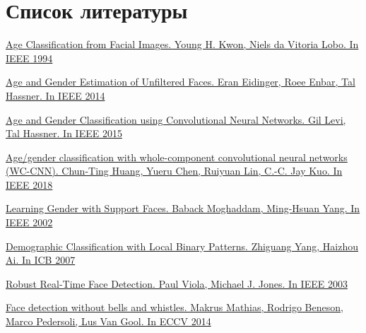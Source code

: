 \documentclass[a4paper,14pt]{extarticle}
\begin{document}
    \section{Список литературы}
    \renewcommand{\section}[2]{}
    \begin{thebibliography}{0}
        \hypertarget{age1994}{}
        \href{https://pdfs.semanticscholar.org/20cb/d360c8e6f70aac3e11853d81e3b18e4866c2.pdf}
        {Age Classification from Facial Images. Young H. Kwon, Niels da Vitoria Lobo. In IEEE 1994}

        \hypertarget{unfiltered}{}
        \href{https://www.openu.ac.il/home/hassner/Adience/EidingerEnbarHassner_tifs.pdf}
        {Age and Gender Estimation of Unfiltered Faces. Eran Eidinger, Roee Enbar, Tal Hassner. In IEEE 2014}

        \hypertarget{hassner}{}
        \href{https://talhassner.github.io/home/projects/cnn_agegender/CVPR2015_CNN_AgeGenderEstimation.pdf}
        {Age and Gender Classification using Convolutional Neural Networks. Gil Levi, Tal Hassner. In IEEE 2015}

        \hypertarget{INDIA}{}
        \href{https://ieeexplore.ieee.org/document/8282221}
        {Age/gender classification with whole-component convolutional neural networks (WC-CNN). Chun-Ting Huang, Yueru Chen, Ruiyuan Lin, C.-C. Jay Kuo. In IEEE 2018}

        \hypertarget{smoll}{}
        \href{https://merl.com/publications/docs/TR2002-12.pdf}
        {Learning Gender with Support Faces. Baback Moghaddam, Ming-Hsuan Yang. In IEEE 2002}

        \hypertarget{lbp_age}{}
        \href{https://link.springer.com/chapter/10.1007/978-3-540-74549-5_49}
        {Demographic Classification with Local Binary Patterns. Zhiguang Yang, Haizhou Ai. In ICB 2007}

        \hypertarget{face_detection}{}
        \href{http://www.face-rec.org/algorithms/Boosting-Ensemble/16981346.pdf}
        {Robust Real-Time Face Detection. Paul Viola, Michael J. Jones. In IEEE 2003}

        \hypertarget{face_detection2}{}
        \href{http://rodrigob.github.io/documents/2014_eccv_face_detection_with_supplementary_material.pdf}
        {Face detection without bells and whistles. Makrus Mathias, Rodrigo Beneson, Marco Pedersoli, Lus Van Gool. In ECCV 2014}


\end{thebibliography}
\end{document}
